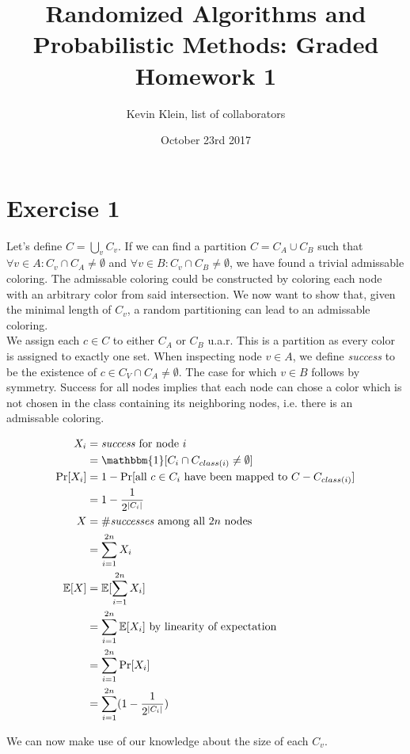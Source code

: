 \documentclass[a4paper,german]{article}
\title{Randomized Algorithms and Probabilistic Methods: Graded Homework 1}
\author{ Kevin Klein, list of collaborators}
\date{October 23rd 2017}
\begin{document}
\maketitle

\section*{Exercise 1}
Let's define \(C = \bigcup_{v} C_v\). If we can find a partition \(C = C_A \cup C_B\) such that \(\forall v \in A: C_v \cap C_A \neq \emptyset \) and \(\forall v \in B: C_v \cap C_B \neq \emptyset \), we have found a trivial admissable coloring. The admissable coloring could be constructed by coloring each node with an arbitrary color from said intersection.
We now want to show that, given the minimal length of \(C_v\), a random partitioning can lead to an admissable coloring. \\

We assign each \(c \in C\) to either \(C_A\) or \(C_B\) u.a.r. This is a partition as every color is assigned to exactly one set. 
When inspecting node \(v \in A\), we define \emph{success} to be the existence of \(c \in C_V \cap C_A \neq \emptyset\). The case for which \(v \in B\) follows by symmetry. Success for all nodes implies that each node can chose a color which is not chosen in the class containing its neighboring nodes, i.e. there is an admissable coloring. 

\begin{align*} X_i &= \text{\emph{success} for node } i  \\
&= \mathbbm{1}[C_i \cap C_{class(i)} \neq \emptyset] \\
\Pr[X_i] &= 1 - \Pr[\text{all } c \in C_i \text{ have been mapped to } C - C_{class(i)}] \\
 &= 1 - \frac{1}{{2}^{|C_i|}} \\
 X &= \text{\#\emph{successes} among all } 2n \text{ nodes}\\
 &= \sum_{i=1}^{2n} X_i \\
 \mathbb{E}[X] &= \mathbb{E}[\sum_{i=1}^{2n} X_i ]\\
 &= \sum_{i=1}^{2n} \mathbb{E}[X_i ] \text{ by linearity of expectation} \\
 &=  \sum_{i=1}^{2n} \Pr[X_i ] \\
&=  \sum_{i=1}^{2n} (1 - \frac{1}{{2}^{|C_i|}}) \\
\end{align*}

We can now make use of our knowledge about the size of each \(C_v\).
\end{document}
